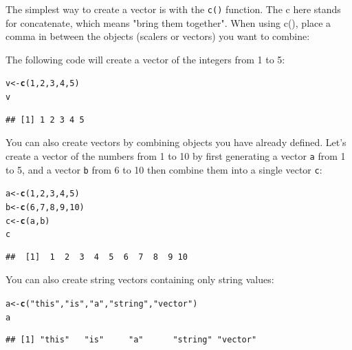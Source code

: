 \documentclass{tufte-book}\usepackage[]{graphicx}\usepackage[]{color}
\makeatletter
\newcommand{\hlnum}[1]{\textcolor[rgb]{0.686,0.059,0.569}{#1}}%
\newcommand{\hlstr}[1]{\textcolor[rgb]{0.192,0.494,0.8}{#1}}%
\newcommand{\hlstd}[1]{\textcolor[rgb]{0.345,0.345,0.345}{#1}}%
\newcommand{\hlkwb}[1]{\textcolor[rgb]{0.69,0.353,0.396}{#1}}%
\newcommand{\hlkwd}[1]{\textcolor[rgb]{0.737,0.353,0.396}{\textbf{#1}}}%
\newenvironment{kframe}{%
 \def\at@end@of@kframe{}%
 \ifinner\ifhmode%
  \def\at@end@of@kframe{\end{minipage}}%
  \begin{minipage}{\columnwidth}%
 \fi\fi%
 \def\FrameCommand##1{\hskip\@totalleftmargin \hskip-\fboxsep
 \colorbox{shadecolor}{##1}\hskip-\fboxsep
     \hskip-\linewidth \hskip-\@totalleftmargin \hskip\columnwidth}%
 \MakeFramed {\advance\hsize-\width
   \@totalleftmargin\z@ \linewidth\hsize
   \@setminipage}}%
 {\par\unskip\endMakeFramed%
 \at@end@of@kframe}
\newenvironment{knitrout}{}{} %
\makeatother
\begin{document}
The simplest way to create a vector is with the \texttt{c()} function. The c here stands for concatenate, which means "bring them together". When using c(), place a comma in between the objects (scalers or vectors) you want to combine:


The following code will create a vector of the integers from 1 to 5:

\begin{knitrout}
\color{fgcolor}\begin{kframe}
\begin{alltt}
\hlstd{v} \hlkwb{<-} \hlkwd{c}\hlstd{(}\hlnum{1}\hlstd{,} \hlnum{2}\hlstd{,} \hlnum{3}\hlstd{,} \hlnum{4}\hlstd{,} \hlnum{5}\hlstd{)}
\hlstd{v}
\end{alltt}
\begin{verbatim}
## [1] 1 2 3 4 5
\end{verbatim}
\end{kframe}
\end{knitrout}

You can also create vectors by combining objects you have already defined. Let's create a vector of the numbers from 1 to 10 by first generating a vector \texttt{a} from 1 to 5, and a vector \texttt{b} from 6 to 10 then combine them into a single vector \texttt{c}:

\begin{knitrout}
\color{fgcolor}\begin{kframe}
\begin{alltt}
\hlstd{a} \hlkwb{<-} \hlkwd{c}\hlstd{(}\hlnum{1}\hlstd{,} \hlnum{2}\hlstd{,} \hlnum{3}\hlstd{,} \hlnum{4}\hlstd{,} \hlnum{5}\hlstd{)}
\hlstd{b} \hlkwb{<-} \hlkwd{c}\hlstd{(}\hlnum{6}\hlstd{,} \hlnum{7}\hlstd{,} \hlnum{8}\hlstd{,} \hlnum{9}\hlstd{,} \hlnum{10}\hlstd{)}
\hlstd{c} \hlkwb{<-} \hlkwd{c}\hlstd{(a, b)}
\hlstd{c}
\end{alltt}
\begin{verbatim}
##  [1]  1  2  3  4  5  6  7  8  9 10
\end{verbatim}
\end{kframe}
\end{knitrout}

You can also create string vectors containing only string values:

\begin{knitrout}
\color{fgcolor}\begin{kframe}
\begin{alltt}
\hlstd{a} \hlkwb{<-} \hlkwd{c}\hlstd{(}\hlstr{"this"}\hlstd{,} \hlstr{"is"}\hlstd{,} \hlstr{"a"}\hlstd{,} \hlstr{"string"}\hlstd{,} \hlstr{"vector"}\hlstd{)}
\hlstd{a}
\end{alltt}
\begin{verbatim}
## [1] "this"   "is"     "a"      "string" "vector"
\end{verbatim}
\end{kframe}
\end{knitrout}
\end{document}

